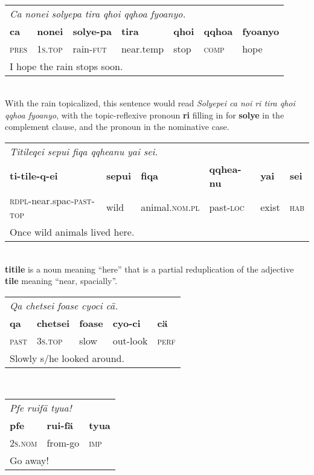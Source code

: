 \documentclass{article}
\begin{document}
\\[0.5cm]
\begin{tabular}{l l l l l l l}
\multicolumn{7}{l}{\emph{Ca nonei solyepa tira qhoi qqhoa fyoanyo.}} \\
\textbf{ca} & \textbf{nonei} & \textbf{solye-pa} & \textbf{tira} & \textbf{qhoi} & \textbf{qqhoa} & \textbf{fyoanyo} \\
\textsc{pres} & \textsc{1s.top} & rain-\textsc{fut} & near.temp & stop & \textsc{comp} & hope \\
\multicolumn{7}{l}{I hope the rain stops soon.} \\
\end{tabular}
\\

With the rain topicalized, this sentence would read \emph{Solyepei ca noi ri tira qhoi qqhoa fyoanyo}, with the topic-reflexive pronoun \textbf{ri} filling in for \textbf{solye} in the complement clause, and the pronoun in the nominative case.
\\[0.5cm]
\begin{tabular}{l l l l l l}
\multicolumn{6}{l}{\emph{Titileqei sepui fiqa qqheanu yai sei.}} \\
\textbf{ti-tile-q-ei} & \textbf{sepui} & \textbf{fiqa} & \textbf{qqhea-nu} & \textbf{yai} & \textbf{sei} \\
\textsc{rdpl}-near.spac-\textsc{past-top} & wild & animal.\textsc{nom.pl} & past-\textsc{loc} & exist & \textsc{hab} \\
\multicolumn{6}{l}{Once wild animals lived here.} \\
\end{tabular}
\\

\textbf{titile} is a noun meaning ``here'' that is a partial reduplication of the adjective \textbf{tile} meaning ``near, spacially''.
\\[0.5cm]
\begin{tabular}{l l l l l}
\multicolumn{5}{l}{\emph{Qa chetsei foase cyoci c\"a.}} \\
\textbf{qa} & \textbf{chetsei} & \textbf{foase} & \textbf{cyo-ci} & \textbf{c\"a} \\
\textsc{past} & \textsc{3s.top} & slow & out-look & \textsc{perf} \\
\multicolumn{5}{l}{Slowly s/he looked around.} \\
\end{tabular}
\\[0.5cm]
\begin{tabular}{l l l}
\multicolumn{3}{l}{\emph{Pfe ruif\"a tyua!}} \\
\textbf{pfe} & \textbf{rui-f\"a} & \textbf{tyua} \\
\textsc{2s.nom} & from-go & \textsc{imp} \\
\multicolumn{3}{l}{Go away!} \\
\end{tabular}
\\
\end{document}
